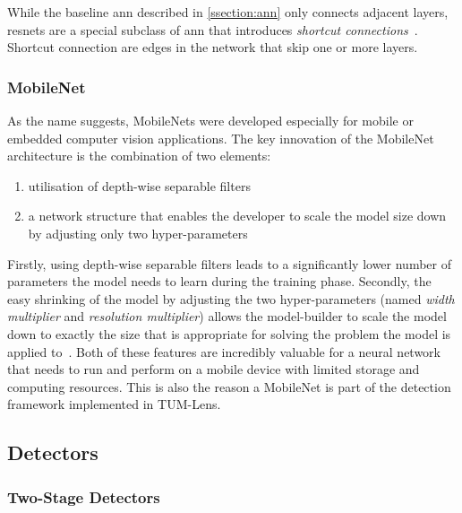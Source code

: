\documentclass[
			   fontsize=11pt,
               paper=a4,
               bibliography=totoc,
               idxtotoc,
               headsepline,
               footsepline,
               footinclude=false,
               BCOR=12mm,
               DIV=13,
               openany,   %
               oneside    %
               ]
               {scrbook}
\begin{document}
While the baseline \gls{ann} described in \autoref{ssection:ann} only connects adjacent layers, \glspl{resnet} are a special subclass of \gls{ann} that introduces \textit{shortcut connections}~\cite{backboneResNet}. Shortcut connection are edges in the network that skip one or more layers.

\subsubsection{MobileNet} \label{sssec:mobilenet}
As the name suggests, MobileNets were developed especially for mobile or embedded computer vision applications. The key innovation of the MobileNet architecture is the combination of two elements:
\begin{enumerate}
	\item utilisation of depth-wise separable filters~\cite{depthSep}
	\item a network structure that enables the developer to scale the model size down by adjusting only two hyper-parameters
\end{enumerate}

\noindent Firstly, using depth-wise separable filters leads to a significantly lower number of parameters the model needs to learn during the training phase. Secondly, the easy shrinking of the model by adjusting the two hyper-parameters (named \textit{width multiplier} and \textit{resolution multiplier}) allows the model-builder to scale the model down to exactly the size that is appropriate for solving the problem the model is applied to~\cite{backboneMobileNet}. Both of these features are incredibly valuable for a neural network that needs to run and perform on a mobile device with limited storage and computing resources. This is also the reason a MobileNet is part of the detection framework implemented in TUM-Lens.

\subsection{Detectors}


\subsubsection{Two-Stage Detectors}
\end{document}
